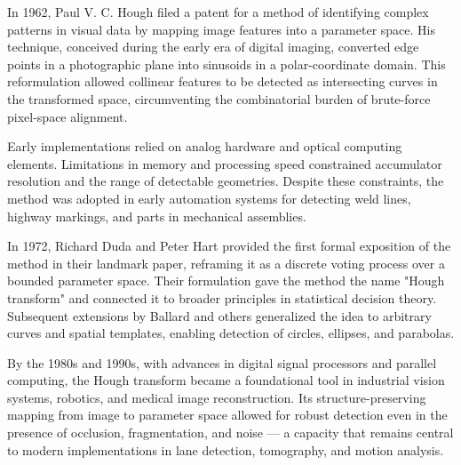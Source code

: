 
\begin{historical}
In 1962, Paul V. C. Hough filed a patent for a method of identifying complex patterns in visual data by mapping image features into a parameter space. His technique, conceived during the early era of digital imaging, converted edge points in a photographic plane into sinusoids in a polar-coordinate domain. This reformulation allowed collinear features to be detected as intersecting curves in the transformed space, circumventing the combinatorial burden of brute-force pixel-space alignment.

Early implementations relied on analog hardware and optical computing elements. Limitations in memory and processing speed constrained accumulator resolution and the range of detectable geometries. Despite these constraints, the method was adopted in early automation systems for detecting weld lines, highway markings, and parts in mechanical assemblies.

In 1972, Richard Duda and Peter Hart provided the first formal exposition of the method in their landmark paper, reframing it as a discrete voting process over a bounded parameter space. Their formulation gave the method the name "Hough transform" and connected it to broader principles in statistical decision theory. Subsequent extensions by Ballard and others generalized the idea to arbitrary curves and spatial templates, enabling detection of circles, ellipses, and parabolas.

By the 1980s and 1990s, with advances in digital signal processors and parallel computing, the Hough transform became a foundational tool in industrial vision systems, robotics, and medical image reconstruction. Its structure-preserving mapping from image to parameter space allowed for robust detection even in the presence of occlusion, fragmentation, and noise  —  a capacity that remains central to modern implementations in lane detection, tomography, and motion analysis.
\end{historical}